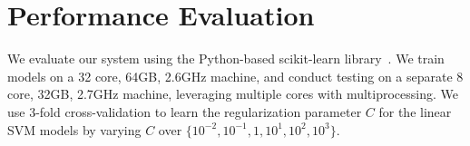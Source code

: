 


\section{Performance Evaluation} 
\label{sec:results} 
We evaluate our system using the Python-based scikit-learn
library~\cite{scikit-learn}.  We train models on a 32 core, 64GB,
2.6GHz machine, and conduct testing on a separate 8 core, 32GB, 2.7GHz
machine, leveraging multiple cores with multiprocessing.  We use
3-fold cross-validation to learn the regularization parameter $C$ for
the linear SVM models by varying $C$ over {$\{10^{-2}, 10^{-1}, 1,
  10^{1}, 10^{2}, 10^{3}\}$}.

